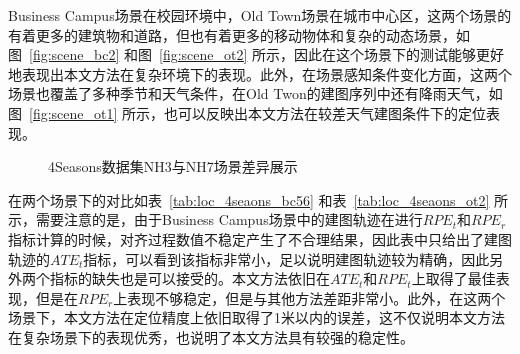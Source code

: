 Business Campus场景在校园环境中，Old Town场景在城市中心区，这两个场景的有着更多的建筑物和道路，但也有着更多的移动物体和复杂的动态场景，如图~\ref{fig:scene_bc2} 和图~\ref{fig:scene_ot2} 所示，因此在这个场景下的测试能够更好地表现出本文方法在复杂环境下的表现。此外，在场景感知条件变化方面，这两个场景也覆盖了多种季节和天气条件，在Old Twon的建图序列中还有降雨天气，如图~\ref{fig:scene_ot1} 所示，也可以反映出本文方法在较差天气建图条件下的定位表现。

\begin{figure}
  \centering
  \caption{4Seasons数据集NH3与NH7场景差异展示}
  \label{fig:scene_bcot}
\end{figure}

在两个场景下的对比如表~\ref{tab:loc_4seaons_bc56} 和表~\ref{tab:loc_4seaons_ot2} 所示，需要注意的是，由于Business Campus场景中的建图轨迹在进行$RPE_t$和$RPE_r$指标计算的时候，对齐过程数值不稳定产生了不合理结果，因此表中只给出了建图轨迹的$ATE_t$指标，可以看到该指标非常小，足以说明建图轨迹较为精确，因此另外两个指标的缺失也是可以接受的。本文方法依旧在$ATE_t$和$RPE_t$上取得了最佳表现，但是在$RPE_r$上表现不够稳定，但是与其他方法差距非常小。此外，在这两个场景下，本文方法在定位精度上依旧取得了1米以内的误差，这不仅说明本文方法在复杂场景下的表现优秀，也说明了本文方法具有较强的稳定性。

